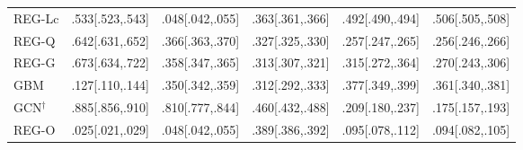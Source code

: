 \begin{tabular}{lccccc}
REG-Lc & .533[.523,.543] & .048[.042,.055] & .363[.361,.366] & .492[.490,.494] & .506[.505,.508] \\
REG-Q & .642[.631,.652] & .366[.363,.370] & .327[.325,.330] & .257[.247,.265] & .256[.246,.266] \\
REG-G & .673[.634,.722] & .358[.347,.365] & .313[.307,.321] & .315[.272,.364] & .270[.243,.306] \\
GBM & .127[.110,.144] & .350[.342,.359] & .312[.292,.333] & .377[.349,.399] & .361[.340,.381] \\
GCN$^{\dagger}$ & .885[.856,.910] & .810[.777,.844] & .460[.432,.488] & .209[.180,.237] & .175[.157,.193] \\
REG-O & .025[.021,.029] & .048[.042,.055] & .389[.386,.392] & .095[.078,.112] & .094[.082,.105] \\
\bottomrule
\end{tabular}
